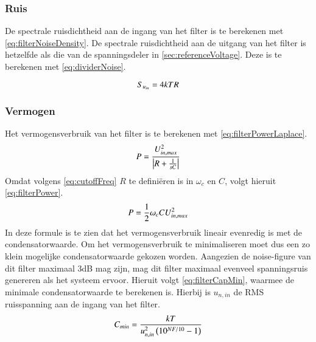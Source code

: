 \subsubsection{Ruis}
De spectrale ruisdichtheid aan de ingang van het filter is te berekenen met \cref{eq:filterNoiseDensity}.
De spectrale ruisdichtheid aan de uitgang van het filter is hetzelfde als die van de spanningsdeler in \cref{sec:referenceVoltage}. Deze is te berekenen met \cref{eq:dividerNoise}.




\begin{equation} \label{eq:filterNoiseDensity}
    S_{u_{in}} = 4kTR
    \tagaddtext{[\si{\volt\squared\per\hertz}]}
\end{equation}


\subsubsection{Vermogen}
Het vermogensverbruik van het filter is te berekenen met \cref{eq:filterPowerLaplace}.
\begin{equation} \label{eq:filterPowerLaplace}
    P = \frac{U_{in,max}^2}{\left|R + \frac{1}{sC}\right|}
    \tagaddtext{[\si{\watt}]}
\end{equation}
Omdat volgens \cref{eq:cutoffFreq} $R$ te definiëren is in $\omega_c$ en $C$, volgt hieruit \cref{eq:filterPower}.
\begin{equation} \label{eq:filterPower}
    P = \frac{1}{2}\omega_cCU_{in,max}^2
    \tagaddtext{[\si{\watt}]}
\end{equation}
In deze formule is te zien dat het vermogensverbruik lineair evenredig is met de condensatorwaarde. Om het vermogensverbruik te minimaliseren moet dus een zo klein mogelijke condensatorwaarde gekozen worden. Aangezien de noise-figure van dit filter maximaal 3dB mag zijn, mag dit filter maximaal evenveel spanningsruis genereren als het systeem ervoor. Hieruit volgt \cref{eq:filterCapMin}, waarmee de minimale condensatorwaarde te berekenen is. Hierbij is $u_{n,in}$ de RMS ruisspanning aan de ingang van het filter.
\begin{equation} \label{eq:filterCapMin}
    C_{min} = \frac{kT}{u_{n,in}^2\left(10^{NF/10}-1\right)}
    \tagaddtext{[\si{\farad}]}
\end{equation}

